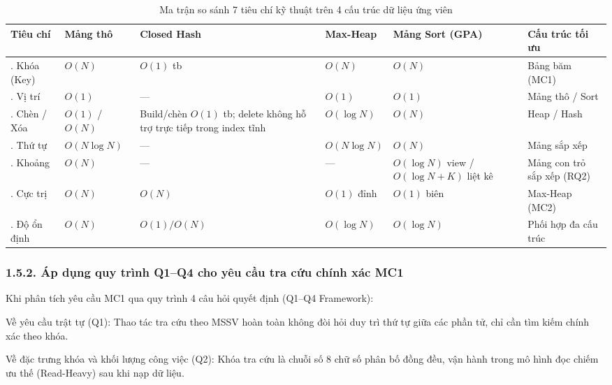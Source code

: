 \documentclass[14pt,a4paper]{extarticle}
\begin{document}
\begin{table}[H]
\centering
\begingroup
{}
\setlength{\tabcolsep}{2pt}
\renewcommand{\arraystretch}{1.3}
\begin{tabularx}{\textwidth}{|>{\raggedright\arraybackslash}m{2.0cm}|>{\centering\arraybackslash}m{2.3cm}|>{\centering\arraybackslash}m{2.3cm}|>{\centering\arraybackslash}m{2.3cm}|>{\centering\arraybackslash}m{2.5cm}|>{\raggedright\arraybackslash}X|}
\hline
\textbf{Tiêu chí} & \textbf{Mảng thô} & \textbf{Closed Hash} & \textbf{Max-Heap} & \textbf{Mảng Sort (GPA)} & \textbf{Cấu trúc tối ưu} \\ \hline
1. Khóa (Key) & $O(N)$ & $O(1)$ tb & $O(N)$ & $O(N)$ & Bảng băm (MC1) \\ \hline
2. Vị trí & $O(1)$ & --- & $O(1)$ & $O(1)$ & Mảng thô / Sort \\ \hline
3. Chèn / Xóa & $O(1)$ / $O(N)$ & Build/chèn $O(1)$ tb; delete không hỗ trợ trực tiếp trong index tĩnh & $O(\log N)$ & $O(N)$ & Heap / Hash \\ \hline
4. Thứ tự & $O(N \log N)$ & --- & $O(N \log N)$ & $O(N)$ & Mảng sắp xếp \\ \hline
5. Khoảng & $O(N)$ & --- & --- & $O(\log N)$ view / $O(\log N + K)$ liệt kê & Mảng con trỏ sắp xếp (RQ2) \\ \hline
6. Cực trị & $O(N)$ & $O(N)$ & $O(1)$ đỉnh & $O(1)$ biên & Max-Heap (MC2) \\ \hline
7. Độ ổn định & $O(N)$ & $O(1) / O(N)$ & $O(\log N)$ & $O(\log N)$ & Phối hợp đa cấu trúc \\ \hline
\end{tabularx}
\endgroup
\caption{Ma trận so sánh 7 tiêu chí kỹ thuật trên 4 cấu trúc dữ liệu ứng viên}
\label{tab:criteria_matrix}
\end{table}

\subsubsection*{1.5.2. Áp dụng quy trình Q1--Q4 cho yêu cầu tra cứu chính xác MC1}
{}

Khi phân tích yêu cầu MC1 qua quy trình 4 câu hỏi quyết định (Q1--Q4 Framework):

Về yêu cầu trật tự (Q1): Thao tác tra cứu theo MSSV hoàn toàn không đòi hỏi duy trì thứ tự giữa các phần tử, chỉ cần tìm kiếm chính xác theo khóa.

Về đặc trưng khóa và khối lượng công việc (Q2): Khóa tra cứu là chuỗi số 8 chữ số phân bố đồng đều, vận hành trong mô hình đọc chiếm ưu thế (Read-Heavy) sau khi nạp dữ liệu.
\end{document}

